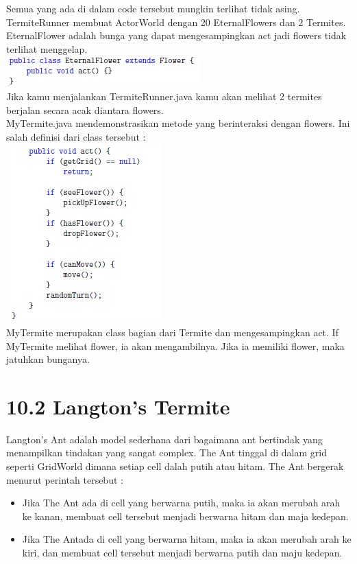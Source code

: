 \documentclass{article}
\begin{document}
	Semua yang ada di dalam code tersebut mungkin terlihat tidak asing. TermiteRunner membuat ActorWorld dengan 20 EternalFlowers dan 2 Termites.
	\\
	
	EternalFlower adalah bunga yang dapat mengesampingkan act jadi flowers tidak terlihat menggelap.
	\\
	\includegraphics{F1}
	\\
	
	Jika kamu menjalankan TermiteRunner.java kamu akan melihat 2 termites berjalan secara acak diantara flowers.
	\\
	
	MyTermite.java mendemonstrasikan metode yang berinteraksi dengan flowers. Ini salah definisi dari class tersebut : 
	\\
	\includegraphics{G1}
	\\
	
	MyTermite merupakan class bagian dari Termite dan mengesampingkan act. If MyTermite melihat flower, ia akan mengambilnya. Jika ia memiliki flower, maka jatuhkan bunganya.
	\\
	
	\section*{10.2 Langton's Termite}
	Langton’s Ant adalah model sederhana dari bagaimana ant bertindak yang menampilkan tindakan yang sangat complex. The Ant tinggal di dalam grid seperti GridWorld dimana setiap cell dalah putih atau hitam. The Ant bergerak menurut perintah tersebut : 
	\\
	
	\begin{itemize}
		\item Jika The Ant ada di cell yang berwarna putih, maka ia akan merubah arah ke kanan, membuat cell tersebut menjadi berwarna hitam dan maja kedepan.
		\item Jika The Antada di cell yang berwarna hitam, maka ia akan merubah arah ke kiri, dan membuat cell tersebut menjadi berwarna putih dan maju kedepan.
	\end{itemize}
	\newpage
	
\end{document}
